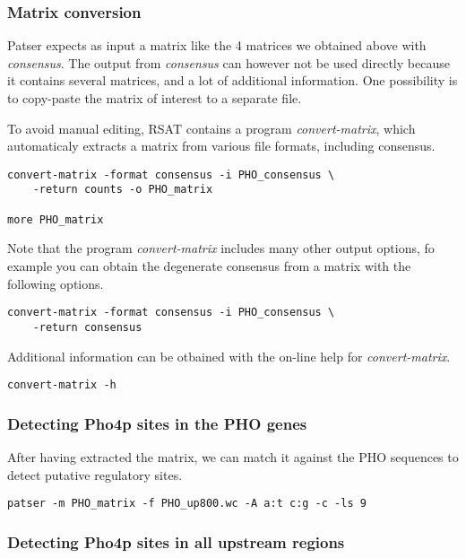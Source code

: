 \subsubsection{Matrix conversion}

Patser expects as input a matrix like the 4 matrices we obtained above
with \textit{consensus}. The output from \textit{consensus} can however
not be used directly because it contains several matrices, and a lot
of additional information. One possibility is to copy-paste the matrix
of interest to a separate file.

To avoid manual editing, RSAT contains a program
\textit{convert-matrix}, which automaticaly extracts a matrix from
various file formats, including consensus.

\begin{verbatim}
convert-matrix -format consensus -i PHO_consensus \
    -return counts -o PHO_matrix 

more PHO_matrix
\end{verbatim}

Note that the program \textit{convert-matrix} includes many other
output options, fo example you can obtain the degenerate consensus
from a matrix with the following options.

\begin{verbatim}
convert-matrix -format consensus -i PHO_consensus \
    -return consensus
\end{verbatim}

Additional information can be otbained with the on-line help for
\textit{convert-matrix}.

\begin{verbatim}
convert-matrix -h
\end{verbatim}

\subsubsection{Detecting Pho4p sites in the PHO genes}

After having extracted the matrix, we can match it against the PHO
sequences to detect putative regulatory sites.

\begin{verbatim}
patser -m PHO_matrix -f PHO_up800.wc -A a:t c:g -c -ls 9
\end{verbatim}

\subsubsection{Detecting Pho4p sites in all upstream regions}

